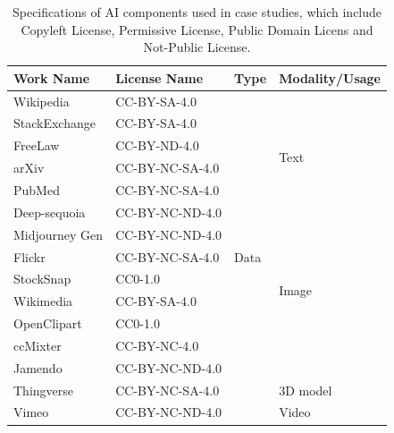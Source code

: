 \begin{table}[t]
    \caption{Specifications of AI components used in case studies, which include \textcolor{Copyleft}{Copyleft License}, \textcolor{Permissive}{Permissive License}, \textcolor{Public}{Public Domain Licens} and Not-Public License.}
    \footnotesize
    \label{tab:works}
    \begin{tabular}{|p{1.6cm}|p{3cm}|p{0.6cm}|p{1.7cm}|}
        \hline
        \rowcolor[gray]{.8}
        \textbf{Work Name} & \textbf{License Name} & \textbf{Type} & \textbf{Modality/Usage}  \\ \hline
        Wikipedia & \textcolor{Copyleft}{CC-BY-SA-4.0} & \multirow{15}{*}{Data} & \multirow{6}{*}{Text}   \\ \cline{1-2}
        StackExchange & \textcolor{Copyleft}{CC-BY-SA-4.0}  &  &    \\ \cline{1-2}
        FreeLaw & CC-BY-ND-4.0 &  &   \\ \cline{1-2}
        arXiv & \textcolor{Copyleft}{CC-BY-NC-SA-4.0} &  &   \\ \cline{1-2}
        PubMed & \textcolor{Copyleft}{CC-BY-NC-SA-4.0} &  &    \\ \cline{1-2}
        Deep-sequoia & CC-BY-NC-ND-4.0 &  &   \\ \cline{1-2} \cline{4-4}

        Midjourney Gen & CC-BY-NC-ND-4.0 &  & \multirow{6}{*}{Image}  \\ \cline{1-2}
        Flickr & \textcolor{Copyleft}{CC-BY-NC-SA-4.0} &  &   \\ \cline{1-2}
        StockSnap & \textcolor{Public}{CC0-1.0} &  &   \\ \cline{1-2}
        Wikimedia & \textcolor{Copyleft}{CC-BY-SA-4.0} &  &   \\ \cline{1-2}
        OpenClipart & \textcolor{Public}{CC0-1.0} &  &   \\ \cline{1-2} \cline{4-4}
        
        ccMixter & \textcolor{Permissive}{CC-BY-NC-4.0} & & \multirow{2}{*}{Voice}  \\ \cline{1-2}
        Jamendo & CC-BY-NC-ND-4.0 &  &   \\ \cline{1-2} \cline{4-4}
        
        Thingverse & \textcolor{Copyleft}{CC-BY-NC-SA-4.0} &  & 3D model  \\ \cline{1-2} \cline{4-4}

        Vimeo & CC-BY-NC-ND-4.0 &  & Video  \\ \hline


\end{tabular}
\end{table}
